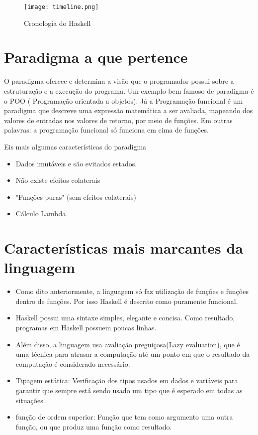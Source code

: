 \documentclass[
  article,			       %
  12pt,				         %
  oneside,			       %
  a4paper,			       %
  english,		       	 %
  brazil,			      	 %
  sumario=tradicional
]{abntex2}
\begin{document}
    \begin{figure}[ht]
      \texttt{[image: timeline.png]}
      \caption{Cronologia do Haskell}
    \end{figure}

    \newpage

    \chapter{Paradigma a que pertence}

    O paradigma oferece e determina a visão que o programador possui sobre a estruturação
    e a execução do programa. Um exemplo bem famoso de paradigma é o POO ( Programação orientada a objetos).
    Já a Programação funcional é um paradigma que descreve uma expressão matemática a ser avaliada,
    mapeando dos valores de entradas nos valores de retorno, por meio de funções. Em outras palavras: 
    a programação funcional só funciona em cima de funções.

    Eis mais algumas características do paradigma
    \begin{itemize}
      \item Dados imutáveis e são evitados estados. 
      \item Não existe efeitos colaterais 
      \item "Funções puras" (sem efeitos colaterais)
      \item Cálculo Lambda
    \end{itemize}

    \newpage

    \chapter{Características mais marcantes da linguagem}

    \begin{itemize}
      \item Como dito anteriormente, a linguagem só faz utilização de funções e funções dentro de funções. Por isso
      Haskell é descrito como puramente funcional.
      \item Haskell possui uma sintaxe simples, elegante e concisa. Como resultado, programas em Haskell possuem 
      poucas linhas. 
      \item Além disso, a linguagem usa avaliação preguiçosa(Lazy evaluation), que é uma técnica para atrasar a computação 
      até um ponto em que o resultado da computação é considerado necessário.
      \item Tipagem estática: Verificação dos tipos usados em dados e variáveis para 
      garantir que sempre está sendo usado um tipo que é esperado em todas as situações. 
      \item função de ordem superior: Função que tem como argumento uma outra função, ou que produz 
      uma função como resultado.
    \end{itemize}
\end{document}
